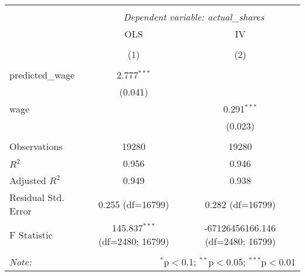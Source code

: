 \begin{table}[!htbp] \centering
\begin{tabular}{@{\extracolsep{5pt}}lcc}
\\[-1.8ex]\hline
\hline \\[-1.8ex]
& \multicolumn{2}{c}{\textit{Dependent variable: actual\_shares}} \
\cr \cline{2-3}
\\[-1.8ex] & \multicolumn{1}{c}{OLS} & \multicolumn{1}{c}{IV}  \\
\\[-1.8ex] & (1) & (2) \\
\hline \\[-1.8ex]
 predicted\_wage & 2.777$^{***}$ & \\
& (0.041) & \\
 wage & & 0.291$^{***}$ \\
& & (0.023) \\
\hline \\[-1.8ex]
 Observations & 19280 & 19280 \\
 $R^2$ & 0.956 & 0.946 \\
 Adjusted $R^2$ & 0.949 & 0.938 \\
 Residual Std. Error & 0.255 (df=16799) & 0.282 (df=16799) \\
 F Statistic & 145.837$^{***}$ (df=2480; 16799) & -67126456166.146$^{}$ (df=2480; 16799) \\
\hline
\hline \\[-1.8ex]
\textit{Note:} & \multicolumn{2}{r}{$^{*}$p$<$0.1; $^{**}$p$<$0.05; $^{***}$p$<$0.01} \\
\end{tabular}
\end{table}